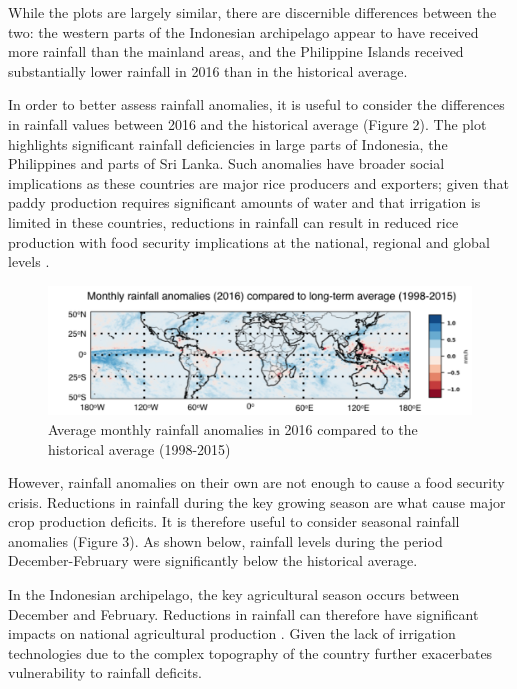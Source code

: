 \documentclass[12pt]{article}
\begin{document}
While the plots are largely similar, there are discernible differences between the two: the western parts of the Indonesian archipelago appear to have received more rainfall than the mainland areas, and the Philippine Islands received substantially lower rainfall in 2016 than in the historical average.

In order to better assess rainfall anomalies, it is useful to consider the differences in rainfall values between 2016 and the historical average (Figure 2). The plot highlights significant rainfall deficiencies in large parts of Indonesia, the Philippines and parts of Sri Lanka. Such anomalies have broader social implications as these countries are major rice producers and exporters; given that paddy production requires significant amounts of water and that irrigation is limited in these countries, reductions in rainfall can result in reduced rice production with food security implications at the national, regional and global levels \cite{zubair2002nino, haile2005weather}. 

\begin{figure}[H]
    \label{fig:lta-difference}
\begin{center}
   \includegraphics[width=1\linewidth]{figures/lta-diff.png}
\end{center}
\caption{Average monthly rainfall anomalies in 2016 compared to the historical average (1998-2015)}
\end{figure}

However, rainfall anomalies on their own are not enough to cause a food security crisis. Reductions in rainfall during the key growing season are what cause major crop production deficits. It is therefore useful to consider seasonal rainfall anomalies (Figure 3). As shown below, rainfall levels during the period December-February were significantly below the historical average. 

In the Indonesian archipelago, the key agricultural season occurs between December and February. Reductions in rainfall can therefore have significant impacts on national agricultural production \cite{naylor2001using}. Given the lack of irrigation technologies due to the complex topography of the country further exacerbates vulnerability to rainfall deficits. 
\end{document}
